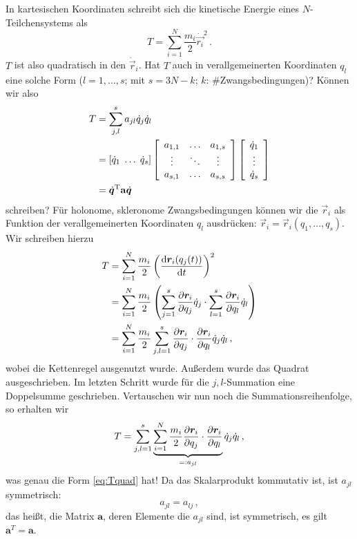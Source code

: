 \documentclass[paper=a4, fontsize=11.0pt, abstractoff, DIV12]{scrartcl}
\begin{document}
In kartesischen Koordinaten schreibt sich die kinetische Energie eines
$N$-Teilchensystems als
\begin{equation}
T = \sum\limits_{i=1}^{N} \frac{m_i}{2} \dot{\vec{r_i}}^2 \, .
\end{equation}
$T$ ist also quadratisch in den $\dot{\vec r}_i$. Hat $T$ auch in
verallgemeinerten Koordinaten $q_l$ eine solche Form ($l=1,\dots,s$; mit $s=3N-k$; $k$:
\#Zwangsbedingungen)? Können wir also
\begin{align}
T &= \sum\limits_{j,l}^{s} a_{jl} \dot{q}_j \dot{q}_l\nonumber\\
&= \left[ \dot{q}_1\; \dots\;\dot{q}_{s} \right] \threeMatrix{a_{1,1}}{\dots}{a_{1,s}}{\vdots}{\ddots}{\vdots}{a_{s,1}}{\dots}{a_{s, s}}
\DreierVec{\dot{q}_{1}}{\vdots}{\dot{q}_{s}}\nonumber\\
&= \dot{\vec{q}}^\mathrm{T} \mathbf{a} \dot{\vec{q}}
\label{eq:Tquad}
\end{align}
schreiben? Für holonome, skleronome Zwangsbedingungen können wir die $\vec r_i$
als Funktion der verallgemeinerten Koordinaten $q_l$ ausdrücken:
$\vec r_i = \vec r_i(q_1, \dots, q_{s})$. Wir schreiben hierzu
\begin{align}
T &=  \sum\limits_{i=1}^{N} \frac{m_i}{2} \left(\frac{\mathrm{d}{\boldsymbol{r}}_i(q_j(t))}{\mathrm{d}t}\right)^2\nonumber\\
&= \sum\limits_{i=1}^{N} \frac{m_i}{2} \left( \sum\limits_{j=1}^{s} \frac{\partial {\ensuremath{\boldsymbol{r}}}_i}{\partial q_j}\dot{q}_j \cdot  \sum\limits_{l=1}^{s} \frac{\partial {\ensuremath{\boldsymbol{r}}}_i}{\partial q_l}\dot{q}_l \right)\nonumber\\
&= \sum\limits_{i=1}^{N} \frac{m_i}{2} \sum\limits_{j,l=1}^{s} \frac{\partial {\ensuremath{\boldsymbol{r}}}_i}{\partial q_j} \cdot \frac{\partial {\ensuremath{\boldsymbol{r}}}_i}{\partial q_l}\dot{q}_j \dot{q}_l \, ,
\end{align}
wobei die Kettenregel ausgenutzt wurde. Außerdem wurde das Quadrat
ausgeschrieben. Im letzten Schritt wurde für die $j,l$-Summation eine
Doppelsumme geschrieben. Vertauschen wir nun noch die Summationsreihenfolge,
so erhalten wir
\begin{equation}
T = \sum\limits_{j,l=1}^{s} \underbrace{\sum\limits_{i=1}^{N} \frac{m_i}{2} \frac{\partial {\ensuremath{\boldsymbol{r}}}_i}{\partial q_j} \cdot \frac{\partial {\ensuremath{\boldsymbol{r}}}_i}{\partial q_l}}_{=:a_{jl}} \dot{q}_j \dot{q}_l \, ,
\end{equation}
was genau die Form \eqref{eq:Tquad} hat! Da das Skalarprodukt kommutativ ist,
ist $a_{jl}$ symmetrisch:
\begin{equation}
a_{jl} = a_{lj}\, ,
\end{equation}
das heißt, die Matrix $\mathbf{a}$, deren Elemente die $a_{jl}$ sind, ist
symmetrisch, es gilt $\mathbf{a}^{T} = \mathbf{a}$.
\end{document}
